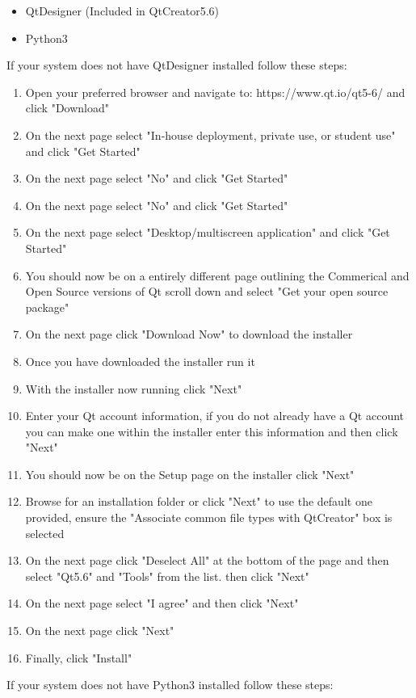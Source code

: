 \begin{itemize}
	\item QtDesigner (Included in QtCreator5.6)
	\item Python3
\end{itemize}
If your system does not have QtDesigner installed follow these steps:
\begin{enumerate}
	\item Open your preferred browser and navigate to: https://www.qt.io/qt5-6/ and click "Download"
	\item On the next page select "In-house deployment, private use, or student use" and click "Get Started"
	\item On the next page select "No" and click "Get Started"
	\item On the next page select "No" and click "Get Started"
	\item On the next page select "Desktop/multiscreen application" and click "Get Started"
	\item You should now be on a entirely different page outlining the Commerical and Open Source versions of Qt scroll down and select "Get your open source package"
	\item On the next page click "Download Now" to download the installer
	\item Once you have downloaded the installer run it
	\item With the installer now running click "Next"
	\item Enter your Qt account information, if you do not already have a Qt account you can make one within the installer enter this information and then click "Next"
	\item You should now be on the Setup page on the installer click "Next"
	\item Browse for an installation folder or click "Next" to use the default one provided, ensure the "Associate common file types with QtCreator" box is selected 
	\item On the next page click "Deselect All" at the bottom of the page and then select "Qt5.6" and "Tools" from the list. then click "Next"
	\item On the next page select "I agree" and then click "Next"
	\item On the next page click "Next"
	\item Finally, click "Install"
\end{enumerate}
If your system does not have Python3 installed follow these steps:

